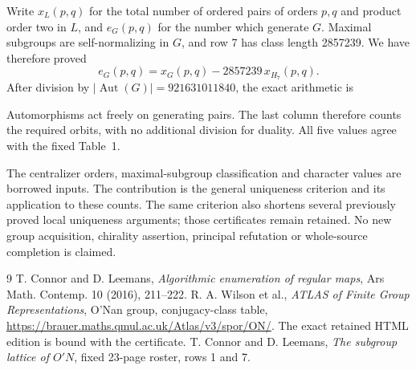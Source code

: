 \documentclass[11pt,a4paper]{article}
\begin{document}
Write $x_L(p,q)$ for the total number of ordered pairs of orders
$p,q$ and product order two in $L$, and $e_G(p,q)$ for the number
which generate $G$. Maximal subgroups are self-normalizing in $G$,
and row 7 has class length 2857239. We have therefore proved
\[
 e_G(p,q)=x_G(p,q)-2857239\,x_{H_7}(p,q).
\]
After division by $|\operatorname{Aut}(G)|=921631011840$, the
exact arithmetic is

Automorphisms act freely on generating pairs. The last column
therefore counts the required orbits, with no additional division
for duality. All five values agree with the fixed Table~1.

The centralizer orders, maximal-subgroup classification and character
values are borrowed inputs. The contribution is the general
uniqueness criterion and its application to these counts. The same
criterion also shortens several previously proved local uniqueness
arguments; those certificates remain retained. No new group
acquisition, chirality assertion, principal refutation or
whole-source completion is claimed.

\begin{thebibliography}{9}
 T. Connor and D. Leemans, \emph{Algorithmic enumeration
of regular maps}, Ars Math. Contemp. 10 (2016), 211--222.
 R. A. Wilson et al., \emph{ATLAS of Finite Group
Representations}, O'Nan group, conjugacy-class table,
\url{https://brauer.maths.qmul.ac.uk/Atlas/v3/spor/ON/}.
The exact retained HTML edition is bound with the certificate.
 T. Connor and D. Leemans, \emph{The subgroup lattice
of $O'N$}, fixed 23-page roster, rows 1 and 7.
\end{thebibliography}
\end{document}
